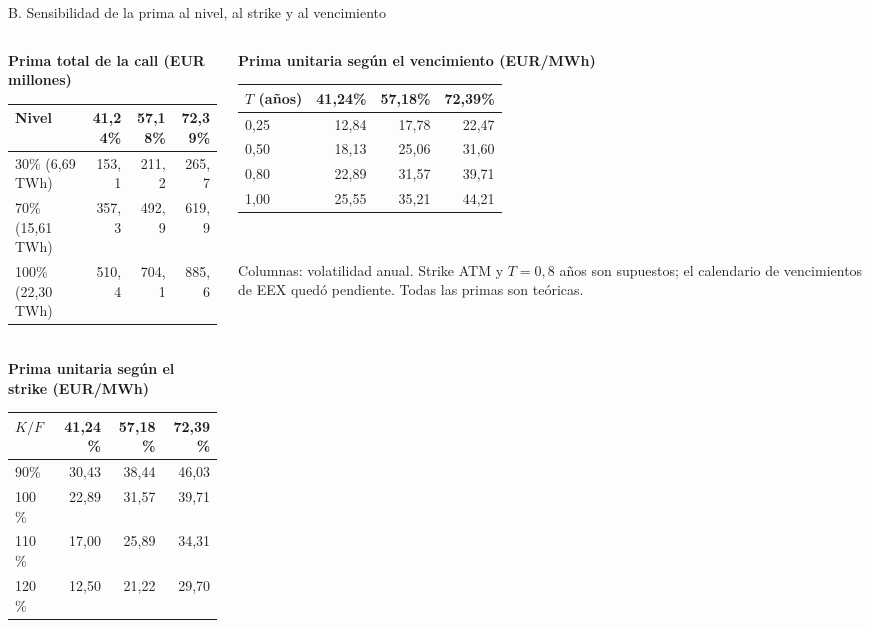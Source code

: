 \documentclass[aspectratio=169,11pt]{beamer}
\newcommand{\fuente}[1]{\vfill{\raggedright\tiny\color{cezgray}Fuente: #1\par}}
\begin{document}
\begin{frame}[t]{B. Sensibilidad de la prima al nivel, al strike y al vencimiento}
  \begin{columns}[T]
    \begin{column}{0.49\textwidth}
      \scriptsize\centering
      {\bfseries Prima total de la call (EUR millones)}\\[1mm]
      \renewcommand{\arraystretch}{1.15}
      \begin{tabular}{@{}lrrr@{}}
        \toprule
        Nivel & 41,24\% & 57,18\% & 72,39\%\\ \midrule
        30\% (6,69 TWh) & 153,1 & 211,2 & 265,7\\
        70\% (15,61 TWh) & 357,3 & 492,9 & 619,9\\
        100\% (22,30 TWh) & 510,4 & 704,1 & 885,6\\ \bottomrule
      \end{tabular}\\[3mm]
      {\bfseries Prima unitaria según el strike (EUR/MWh)}\\[1mm]
      \begin{tabular}{@{}lrrr@{}}
        \toprule
        $K/F$ & 41,24\% & 57,18\% & 72,39\%\\ \midrule
        90\% & 30,43 & 38,44 & 46,03\\
        100\% & 22,89 & 31,57 & 39,71\\
        110\% & 17,00 & 25,89 & 34,31\\
        120\% & 12,50 & 21,22 & 29,70\\ \bottomrule
      \end{tabular}
    \end{column}
    \begin{column}{0.49\textwidth}
      \scriptsize\centering
      {\bfseries Prima unitaria según el vencimiento (EUR/MWh)}\\[1mm]
      \renewcommand{\arraystretch}{1.15}
      \begin{tabular}{@{}lrrr@{}}
        \toprule
        $T$ (años) & 41,24\% & 57,18\% & 72,39\%\\ \midrule
        0,25 & 12,84 & 17,78 & 22,47\\
        0,50 & 18,13 & 25,06 & 31,60\\
        0,80 & 22,89 & 31,57 & 39,71\\
        1,00 & 25,55 & 35,21 & 44,21\\ \bottomrule
      \end{tabular}\\[3mm]
      \begin{minipage}{6.2cm}\raggedright\tiny
      Columnas: volatilidad anual. Strike ATM y $T=0{,}8$ años son supuestos; el calendario de vencimientos de EEX quedó pendiente. Todas las primas son teóricas.
      \end{minipage}
    \end{column}
  \end{columns}
\end{frame}
\end{document}
